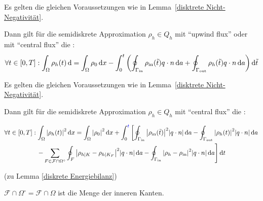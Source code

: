 \begin{Lemma} \label{diskrete Massenbilanz}
	Es gelten die gleichen Voraussetzungen wie in Lemma~\ref{disktrete Nicht-Negativität}.
	
	Dann gilt für die semidiskrete Approximation $ \rho_h \in Q_h$ mit \enquote{upwind flux} oder mit \enquote{central flux} die :
	\[\forall t \in [0,T]: \int_\Omega \rho_h(t) \mathop{}\!\mathrm{d}   = \int_\Omega \rho_0 \mathop{}\!\mathrm{d} x - \int_{0}^{t} \left( \oint_{\Gamma_{{\text{in}}}} \rho_{\text{in}}(\tilde{t}) q \cdot n \mathop{}\!\mathrm{d} a + \oint_{\Gamma_{{\text{out}}}} \rho_h(\tilde{t}) q \cdot n \mathop{}\!\mathrm{d} a  \right) \mathop{}\!\mathrm{d} \tilde{t} \]
\end{Lemma}

\begin{Lemma} \label{diskrete Energiebilanz}	Es gelten die gleichen Voraussetzungen wie in Lemma~\ref{disktrete Nicht-Negativität}.
	
	Dann gilt für die semidiskrete Approximation $ \rho_h \in Q_h $ mit \enquote{central flux} die :
	
	\begin{gather*}
		\forall t \in [0,T]: \int_\Omega \abs{\rho_h(t)}^2 \mathop{}\!\mathrm{d} x = \int_\Omega \abs{\rho_0}^2 \mathop{}\!\mathrm{d} x + \int_{0}^{\textcolor{blue}{t}} \left[ \oint_{\Gamma_{{\text{in}}}} \abs{\rho_{\text{in}}(\tilde{t})}^2 \abs{q \cdot n} \mathop{}\!\mathrm{d} a - \oint_{\Gamma_{{\text{out}}}} \abs{\rho_h(t)}^2 \abs{q \cdot n} \mathop{}\!\mathrm{d} a \right. \\
		\left. - \sum_{F\in \mathcal{F} \cap \Omega^\circ} \oint_F \abs{\rho_{h|K} - \rho_{h|K_F}}^2 \abs{q \cdot n} \mathop{}\!\mathrm{d} a - \oint_{\Gamma_{{\text{in}}}} \abs{\rho_h - \rho_{\text{in}}}^2 \abs{q\cdot n} \mathop{}\!\mathrm{d} a \right] \mathop{}\!\mathrm{d} t
	\end{gather*}
	
\end{Lemma}
 
 
 \begin{remark}(zu Lemma \ref{diskrete Energiebilanz})
 	
 	$ \mathcal{F} \cap \Omega^\circ = \mathcal{F} \cap \Omega $ ist die Menge der inneren Kanten.
 \end{remark}

